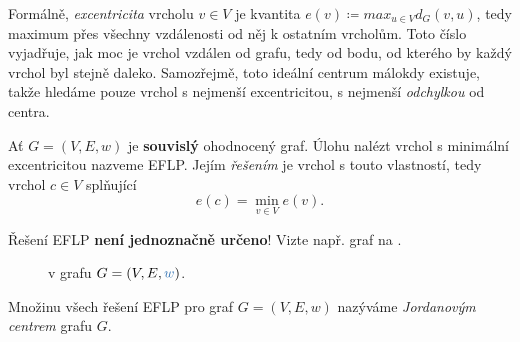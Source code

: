 Formálně, \emph{excentricita} vrcholu $v \in V$ je kvantita $e(v) \coloneqq
max_{u \in V} d_G(v,u)$, tedy maximum přes všechny vzdálenosti od něj k
ostatním vrcholům. Toto číslo vyjadřuje, jak moc je vrchol vzdálen od
 grafu, tedy od bodu, od kterého by každý vrchol byl
stejně daleko. Samozřejmě, toto ideální centrum málokdy existuje, takže hledáme
pouze vrchol s nej\-menší excentricitou, s nejmenší \emph{odchylkou} od centra.

\begin{definition}
\label{def:eflp}
 Ať $G = (V,E,w)$ je \textbf{souvislý} ohodnocený graf. Úlohu nalézt vrchol s
 minimální excentricitou nazveme EFLP. Jejím \emph{řešením} je vrchol s touto
 vlastností, tedy vrchol $c \in V$ splňující
 \[
  e(c) = \min_{v \in V} e(v).
 \]
\end{definition}

\begin{warning}
 Řešení EFLP \textbf{není jednoznačně určeno}! Vizte např. graf na
 .

 \begin{figure}[H]
 \centering
  \caption{ v grafu $G =
  (V,E,\clb{w})$.}
  \label{fig:minimalni-excentricita}
 \end{figure}
\end{warning}

\begin{definition}
\label{def:jordanovo-centrum}
 Množinu všech řešení EFLP pro graf $G = (V,E,w)$ nazýváme \emph{Jordanovým
 centrem} grafu $G$.
\end{definition}

